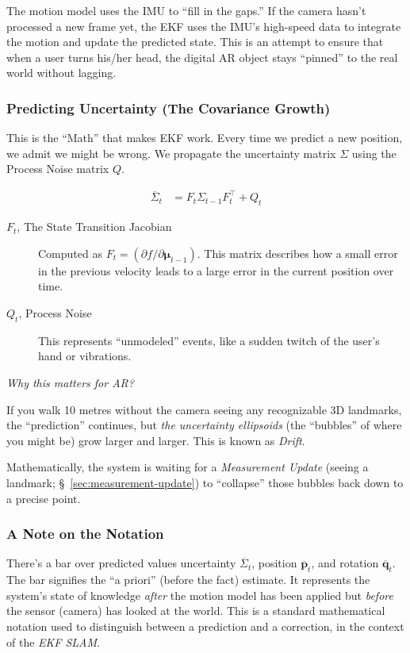 \documentclass[11pt]{article}
\begin{document}
The motion model uses the IMU to ``fill in the gaps.'' If
the camera hasn't processed a new frame yet, the EKF
uses the IMU's high-speed data to integrate the motion
and update the predicted state.  This is an attempt to
ensure that when a user turns his/her head, the digital
AR object stays ``pinned'' to the real world without
lagging.
\subsubsection{Predicting Uncertainty (The Covariance Growth)}
\label{sec:orge3831ba}

This is the ``Math'' that makes EKF work.  Every time we
predict a new position, we admit we might be wrong.  We
propagate the uncertainty matrix \(\Sigma\) using the
Process Noise matrix \(Q\).

\begin{align*}
  \overline{\Sigma}_t
  &= F_t \Sigma_{t-1} F_t^{\top} + Q_t
\end{align*}

\begin{description}
\item[{\(F_t\), The State Transition Jacobian}] Computed as
\(F_{t} = (\partial f/\partial
  \boldsymbol{\mu}_{t-1})\).  This matrix describes how
a small error in the previous velocity leads to a
large error in the current position over time.
\item[{\(Q_t\), Process Noise}] This represents ``unmodeled''
events, like a sudden twitch of the user's hand or
vibrations.
\end{description}

\emph{Why this matters for AR?}

If you walk 10 metres without the camera seeing any
recognizable 3D landmarks, the ``prediction'' continues,
but \emph{the uncertainty ellipsoids} (the ``bubbles'' of
where you might be) grow larger and larger. This is
known as \emph{Drift}.

Mathematically, the system is waiting for a
\emph{Measurement Update} (seeing a landmark;
\S~\ref{sec:measurement-update}) to ``collapse''
those bubbles back down to a precise point.
\subsubsection{A Note on the Notation}
\label{sec:orga20aad8}

There's a bar over predicted values uncertainty
\(\overline{\Sigma}_{t}\), position
\(\overline{\mathbf{p}}_t\), and rotation
\(\overline{\mathbf{q}}_t\).  The bar signifies the ``a
priori'' (before the fact) estimate.  It represents the
system's state of knowledge \emph{after} the motion model
has been applied but \emph{before} the sensor (camera) has
looked at the world.  This is a standard mathematical
notation used to distinguish between a prediction and a
correction, in the context of the \emph{EKF SLAM}.
\end{document}
